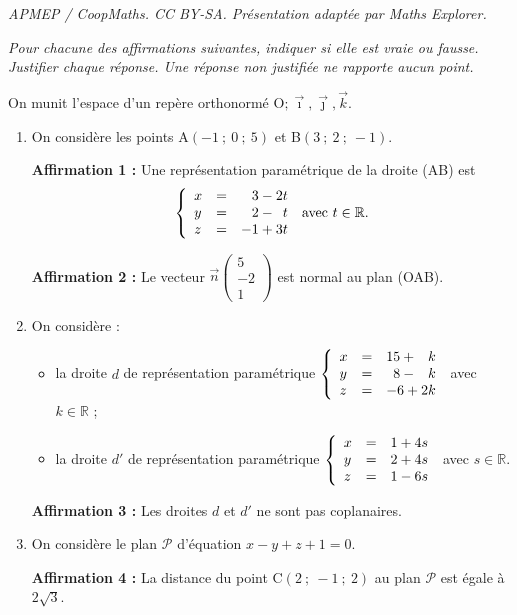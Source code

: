 \documentclass[10pt]{article}
\providecommand{\R}{\mathbb{R}}
\providecommand{\vect}[1]{\overrightarrow{#1}}
\providecommand{\Oijk}{\(\mathrm{O};\vec{\imath},\vec{\jmath},\vec{k}\)}
\begin{document}
\noindent\textit{APMEP / CoopMaths. CC BY-SA. Présentation adaptée par Maths Explorer.}\par\medskip
\medskip

\emph{Pour chacune des affirmations suivantes, indiquer si elle est vraie ou fausse. Justifier chaque réponse. Une réponse non justifiée ne rapporte aucun point.}

\medskip

On munit l'espace d'un repère orthonormé \Oijk.

\medskip

\begin{enumerate}
\item On considère les points A$(-1~;~0~;~5)$ et B$(3~;~2~;~-1)$.

\textbf{Affirmation 1 :} Une représentation paramétrique de la droite (AB) est 
\[\left\{\begin{array}{l c l}
x &=& \phantom{-}3 - 2t\\
y &=&\phantom{-}2- \phantom{2}t\\
z&=&- 1 + 3t
\end{array}\right.\:\text{avec } t \in \R.\]

\textbf{Affirmation 2 :}  Le vecteur $\vect{n}\begin{pmatrix}5\\ -2\\1\end{pmatrix}$  est normal au plan (OAB).

\item  On considère :

\begin{itemize}[label=$\bullet~$]
\item la droite $d$ de représentation paramétrique $\left\{\begin{array}{l c l}x &=&15+ \phantom{-}k\\y &=& \phantom{1}8 - \phantom{-}k\\z &=& - 6 + 2k \end{array}\right.$ avec \:$k\in \R$ ;

\item la droite $d'$ de représentation paramétrique $\left\{\begin{array}{l c l}x&=&1 + 4s\\ y &=& 2 + 4s\\z&=&1- 6s \end{array}\right.$ avec $s \in \R$.
\end{itemize}

\textbf{Affirmation 3 :} Les droites $d$ et $d'$ ne sont pas coplanaires.
\item On considère le plan $\mathcal{P}$ d'équation $x- y + z + 1 = 0$.

\textbf{Affirmation 4 :}  La distance du point C$(2~;~-1~;~2)$ au plan $\mathcal{P}$ est égale à $2\sqrt 3$.
\end{enumerate}

\bigskip
\end{document}
